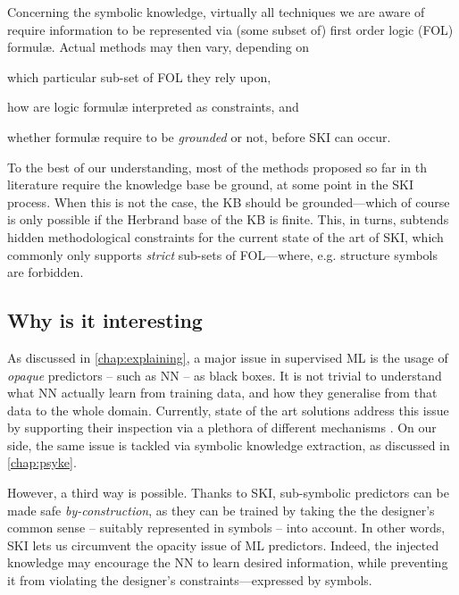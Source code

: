 \documentclass[12pt,a4paper,openright,twoside]{book}
\begin{document}
%
Concerning the symbolic knowledge, virtually all techniques we are aware of require information to be represented via (some subset of) first order logic (FOL) formul\ae{}.
%
Actual methods may then vary, depending on
%
\begin{inlinelist}
    \item which particular sub-set of FOL they rely upon,
    \item how are logic formul\ae{} interpreted as constraints, and
    \item whether formul\ae{} require to be \emph{grounded} or not, before SKI can occur.
\end{inlinelist}
%
To the best of our understanding, most of the methods proposed so far in th literature require the knowledge base be ground, at some point in the SKI process.
%
When this is not the case, the KB should be grounded---which of course is only possible if the Herbrand base of the KB is finite.
%
This, in turns, subtends hidden methodological constraints for the current state of the art of SKI, which commonly only supports \emph{strict} sub-sets of FOL---where, e.g. structure symbols are forbidden.

\subsection{Why is it interesting}

As discussed in \cref{chap:explaining}, a major issue in supervised ML is the usage of \emph{opaque} predictors -- such as NN -- as black boxes.
%
It is not trivial to understand what NN actually learn from training data, and how they generalise from that data to the whole domain.
%
Currently, state of the art solutions address this issue by supporting their inspection via a plethora of different mechanisms \cite{GuidottiMRTGP19}.
%
On our side, the same issue is tackled via symbolic knowledge extraction, as discussed in \cref{chap:psyke}.

However, a third way is possible.
%
Thanks to SKI, sub-symbolic predictors can be made safe \emph{by-construction}, as they can be trained by taking the the designer's common sense -- suitably represented in symbols -- into account.
%
In other words, SKI lets us circumvent the opacity issue of ML predictors.
%
Indeed, the injected knowledge may encourage the NN to learn desired information, while preventing it from violating the designer's constraints---expressed by symbols.
\end{document}

